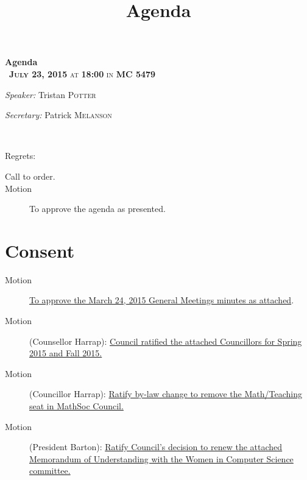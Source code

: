 \documentclass[12pt, letterpaper]{article}
\title{Agenda}
\newcommand{\meetingDate}{July 23, 2015}
\newcommand{\meetingTime}{18:00}
\newcommand{\meetingLocation}{MC 5479}
\begin{document}
\hypersetup{} %


\begin{center}
{ \huge \bfseries Agenda \\[0.4cm] }
{\textsc{~\textbf{\meetingDate} at \textbf{\meetingTime} in \textbf{\meetingLocation}}}
\\[0.2cm]

\begin{minipage}[t]{0.5\textwidth}
\begin{flushleft} \large
\emph{Speaker:}
Tristan \textsc{Potter}
\end{flushleft}
\end{minipage}%
\begin{minipage}[t]{0.5\textwidth}
\begin{flushright} \large
\emph{Secretary:} 
Patrick \textsc{Melanson}
\end{flushright}
\end{minipage}

\HRule \\[0.4cm]
\end{center}
Regrets: 
\begin{description}
	\item[Call to order.]
	\item[Motion] To approve the agenda as presented.
\end{description}
\section*{Consent}
\begin{description}
	\item[Motion] \hyperref[minutes]{To approve the March 24, 2015 General Meetings minutes as attached}.
	\item[Motion] (Counsellor Harrap): \hyperref[noms]{Council ratified the attached Councillors for Spring 2015 and Fall 2015.}
	\item[Motion] (Councillor Harrap): \hyperref[teaching]{Ratify by-law change to remove the Math/Teaching seat in MathSoc Council.}
	\item[Motion] (President Barton): \hyperref[wics]{Ratify Council's decision to renew the attached Memorandum of Understanding with the Women in Computer Science committee.}
\end{description}
\HRule
\end{document}
